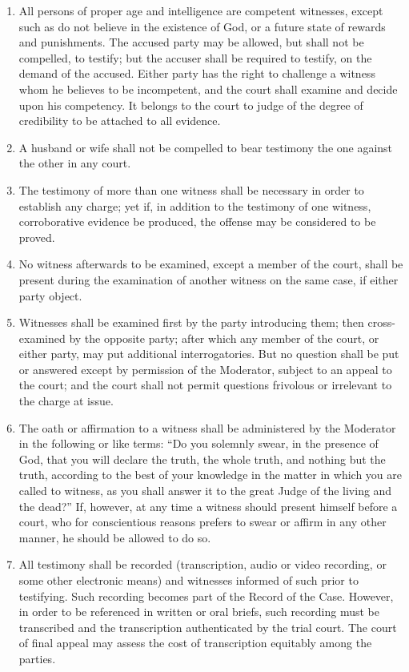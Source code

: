 \documentclass[
]{book}
\providecommand{\tightlist}{%
  \setlength{\itemsep}{0pt}\setlength{\parskip}{0pt}}
\begin{document}
\begin{enumerate}
\def\labelenumi{\arabic{enumi}.}
\tightlist
\item
  \protect\hypertarget{38}{\href{}{}}All persons of proper age and intelligence are competent witnesses, except such as do not believe in the existence of God, or a future state of rewards and punishments. The accused party may be allowed, but shall not be compelled, to testify; but the accuser shall be required to testify, on the demand of the accused. Either party has the right to challenge a witness whom he believes to be incompetent, and the court shall examine and decide upon his competency. It belongs to the court to judge of the degree of credibility to be attached to all evidence.
\item
  A husband or wife shall not be compelled to bear testimony the one against the other in any court.
\item
  The testimony of more than one witness shall be necessary in order to establish any charge; yet if, in addition to the testimony of one witness, corroborative evidence be produced, the offense may be considered to be proved.
\item
  No witness afterwards to be examined, except a member of the court, shall be present during the examination of another witness on the same case, if either party object.
\item
  Witnesses shall be examined first by the party introducing them; then cross-examined by the opposite party; after which any member of the court, or either party, may put additional interrogatories. But no question shall be put or answered except by permission of the Moderator, subject to an appeal to the court; and the court shall not permit questions frivolous or irrelevant to the charge at issue.
\item
  The oath or affirmation to a witness shall be administered by the Moderator in the following or like terms: ``Do you solemnly swear, in the presence of God, that you will declare the truth, the whole truth, and nothing but the truth, according to the best of your knowledge in the matter in which you are called to witness, as you shall answer it to the great Judge of the living and the dead?'' If, however, at any time a witness should present himself before a court, who for conscientious reasons prefers to swear or affirm in any other manner, he should be allowed to do so.
\item
  All testimony shall be recorded (transcription, audio or video recording, or some other electronic means) and witnesses informed of such prior to testifying. Such recording becomes part of the Record of the Case. However, in order to be referenced in written or oral briefs, such recording must be transcribed and the transcription authenticated by the trial court. The court of final appeal may assess the cost of transcription equitably among the parties.

\end{enumerate}
\end{document}
